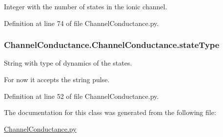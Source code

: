 Integer with the number of states in the ionic channel. 



Definition at line 74 of file Channel\+Conductance.\+py.

\subsubsection[{\texorpdfstring{state\+Type}{stateType}}]{\setlength{\rightskip}{0pt plus 5cm}Channel\+Conductance.\+Channel\+Conductance.\+state\+Type}\hypertarget{class_channel_conductance_1_1_channel_conductance_aa3c889bb4528c3abe7b69862cf87119d}{}\label{class_channel_conductance_1_1_channel_conductance_aa3c889bb4528c3abe7b69862cf87119d}


String with type of dynamics of the states. 

For now it accepts the string pulse. 

Definition at line 52 of file Channel\+Conductance.\+py.



The documentation for this class was generated from the following file\+:\begin{DoxyCompactItemize}
\item 
\hyperlink{_channel_conductance_8py}{Channel\+Conductance.\+py}\end{DoxyCompactItemize}
